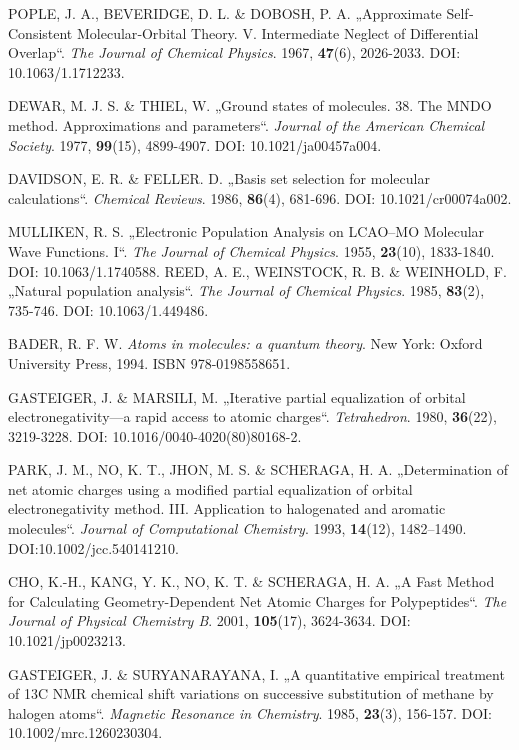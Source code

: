 \begin{thebibliography}{10}
POPLE, J. A., BEVERIDGE, D. L. \& DOBOSH, P. A. „Approximate Self‐Consistent Molecular‐Orbital Theory. V. Intermediate Neglect of Differential Overlap“. \textit{The Journal of Chemical Physics}. 1967, \textbf{47}(6), 2026-2033. DOI: 10.1063/1.1712233.

DEWAR, M. J. S. \& THIEL, W. „Ground states of molecules. 38. The MNDO method. Approximations and parameters“. \textit{Journal of the American Chemical Society}. 1977, \textbf{99}(15), 4899-4907. DOI: 10.1021/ja00457a004.

DAVIDSON, E. R. \& FELLER. D. „Basis set selection for molecular calculations“. \textit{Chemical Reviews}. 1986, \textbf{86}(4), 681-696. DOI: 10.1021/cr00074a002. 

MULLIKEN, R. S. „Electronic Population Analysis on LCAO–MO Molecular Wave Functions. I“. \textit{The Journal of Chemical Physics}. 1955, \textbf{23}(10), 1833-1840. DOI: 10.1063/1.1740588. 
REED, A. E., WEINSTOCK, R. B. \& WEINHOLD, F. „Natural population analysis“. \textit{The Journal of Chemical Physics}. 1985, \textbf{83}(2), 735-746. DOI: 10.1063/1.449486.

BADER, R. F. W. \textit{Atoms in molecules: a quantum theory}. New York: Oxford University Press, 1994. ISBN 978-0198558651.

GASTEIGER, J. \& MARSILI, M. „Iterative partial equalization of orbital electronegativity—a rapid access to atomic charges“. \textit{Tetrahedron}. 1980, \textbf{36}(22), 3219-3228. DOI: 10.1016/0040-4020(80)80168-2.

PARK, J. M., NO, K. T., JHON, M. S. \& SCHERAGA, H. A. „Determination of net atomic charges using a modified partial equalization of orbital electronegativity method. III. Application to halogenated and aromatic molecules“. \textit{Journal of Computational Chemistry}. 1993, \textbf{14}(12), 1482–1490. DOI:10.1002/jcc.540141210.

CHO, K.-H., KANG, Y. K., NO, K. T. \& SCHERAGA, H. A. „A Fast Method for Calculating Geometry-Dependent Net Atomic Charges for Polypeptides“. \textit{The Journal of Physical Chemistry B}. 2001, \textbf{105}(17), 3624-3634. DOI: 10.1021/jp0023213.

GASTEIGER, J. \& SURYANARAYANA, I. „A quantitative empirical treatment of 13C NMR chemical shift variations on successive substitution of methane by halogen atoms“. \textit{Magnetic Resonance in Chemistry}. 1985, \textbf{23}(3), 156-157. DOI: 10.1002/mrc.1260230304. 


\end{thebibliography}
